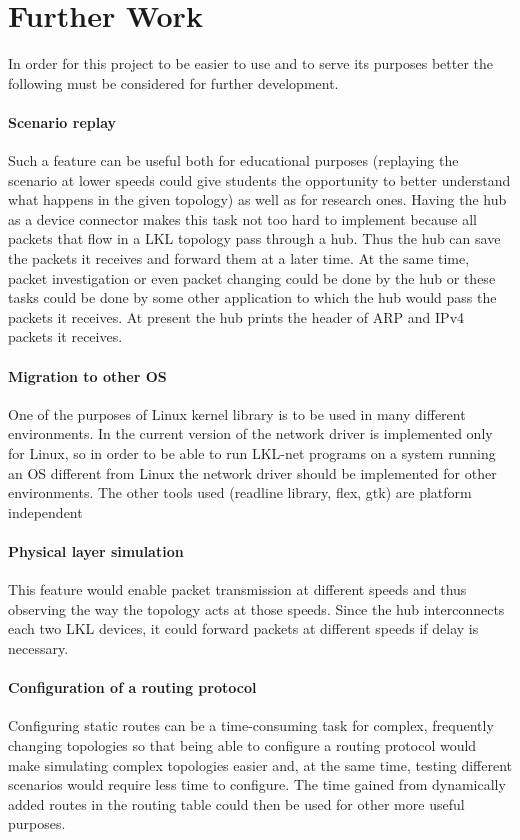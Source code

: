 \chapter{Further Work}
\label{chapter:further}
In order for this project to be easier to use and to serve its purposes better the following must be considered for further development.

\subsubsection{Scenario replay}
\label{sec:scenario-replay}
Such a feature can be useful both for educational purposes (replaying the scenario at lower speeds could give students the opportunity to better understand what happens in the given topology) as well as for research ones. Having the hub as a device connector makes this task not too hard to implement because all packets that flow in a LKL topology pass through a hub. Thus the hub can save the packets it receives and forward them at a later time. At the same time, packet investigation or even packet changing could be done by the hub or these tasks could be done by some other application to which the hub would pass the packets it receives. At present the hub prints the header of ARP and IPv4 packets it receives.

\subsubsection{Migration to other OS}
\label{sec:migration-os}
One of the purposes of Linux kernel library is to be used in many different environments. In the current version of \project the network driver is implemented only for Linux, so in order to be able to run LKL-net programs on a system running an OS different from Linux the network driver should be implemented for other environments.
The other tools used (readline library, flex, gtk) are platform independent

\subsubsection{Physical layer simulation}
\label{sec:physica-sim}
This feature would enable packet transmission at different speeds and thus observing the way the topology acts at those speeds. Since the hub interconnects each two LKL devices, it could forward packets at different speeds if delay is necessary. 

\subsubsection{Configuration of a routing protocol}
\label{sec:routing-prot}
Configuring static routes can be a time-consuming task for complex, frequently changing topologies so that being able to configure a routing protocol would make simulating complex topologies easier and, at the same time, testing different scenarios would require less time to configure. The time gained from dynamically added routes in the routing table could then be used for other more useful purposes.

